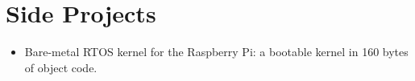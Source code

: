 \section*{Side Projects}
\vspace{-2mm}

\begin{itemize}
    \item Bare-metal RTOS kernel for the Raspberry Pi: a bootable kernel
        in 160 bytes of object code.
\end{itemize}

